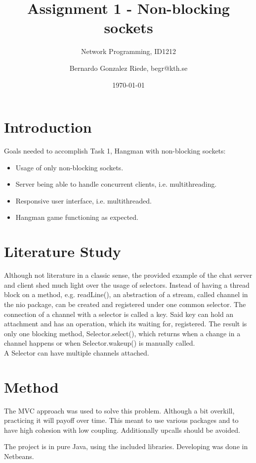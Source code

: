 \documentclass[a4paper]{scrartcl}
\title{Assignment 1 - Non-blocking sockets}
\subtitle{Network Programming, ID1212}
\author{Bernardo Gonzalez Riede, begr@kth.se}
\date{\today}
\begin{document}
\maketitle


\section{Introduction}

Goals needed to accomplish Task 1, Hangman with non-blocking sockets:
\begin{itemize}
    \item Usage of only non-blocking sockets.
    \item Server being able to handle concurrent clients, i.e. multithreading.
    \item Responsive user interface, i.e. multithreaded.
    \item Hangman game functioning as expected.
\end{itemize}


\section{Literature Study}

Although not literature in a classic sense, the provided example of the chat server and client shed much light over the usage of selectors.
Instead of having a thread block on a method, e.g. readLine(), an abstraction of a stream, called channel in the nio package, can be created and registered under one common selector.
The connection of a channel with a selector is called a key.
Said key can hold an attachment and has an operation, which its waiting for, registered.
The result is only one blocking method, Selector.select(), which returns when a change in a channel happens or when Selector.wakeup() is manually called.
\\A Selector can have multiple channels attached.


\section{Method}

The MVC approach was used to solve this problem. Although a bit overkill, practicing it will payoff over time.
This meant to use various packages and to have high cohesion with low coupling. Additionally upcalls should be avoided.


The project is in pure Java, using the included libraries.
Developing was done in Netbeans.
\end{document}
